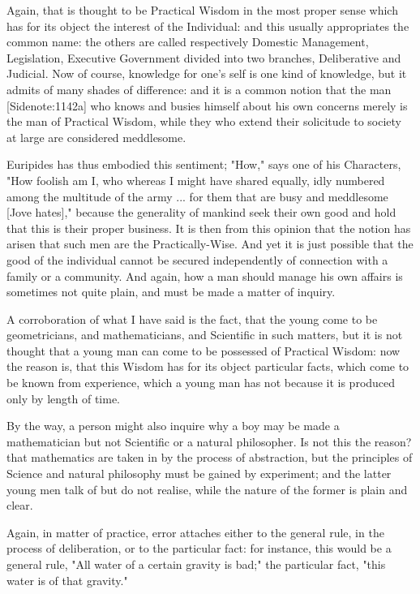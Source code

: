 Again, that is thought to be Practical Wisdom in the most proper sense
which has for its object the interest of the Individual: and this
usually appropriates the common name: the others are called respectively
Domestic Management, Legislation, Executive Government divided into two
branches, Deliberative and Judicial. Now of course, knowledge for
one's self is one kind of knowledge, but it admits of many shades of
difference: and it is a common notion that the man [Sidenote:1142a] who
knows and busies himself about his own concerns merely is the man of
Practical Wisdom, while they who extend their solicitude to society at
large are considered meddlesome.

Euripides has thus embodied this sentiment; "How," says one of his
Characters, "How foolish am I, who whereas I might have shared equally,
idly numbered among the multitude of the army ... for them that are busy
and meddlesome [Jove hates]," because the generality of mankind seek
their own good and hold that this is their proper business. It is then
from this opinion that the notion has arisen that such men are the
Practically-Wise. And yet it is just possible that the good of the
individual cannot be secured independently of connection with a family
or a community. And again, how a man should manage his own affairs is
sometimes not quite plain, and must be made a matter of inquiry.

A corroboration of what I have said is the fact, that the young come to
be geometricians, and mathematicians, and Scientific in such matters,
but it is not thought that a young man can come to be possessed of
Practical Wisdom: now the reason is, that this Wisdom has for its object
particular facts, which come to be known from experience, which a young
man has not because it is produced only by length of time.

By the way, a person might also inquire why a boy may be made a
mathematician but not Scientific or a natural philosopher. Is not this
the reason? that mathematics are taken in by the process of abstraction,
but the principles of Science and natural philosophy must be gained by
experiment; and the latter young men talk of but do not realise, while
the nature of the former is plain and clear.

Again, in matter of practice, error attaches either to the general rule,
in the process of deliberation, or to the particular fact: for instance,
this would be a general rule, "All water of a certain gravity is bad;"
the particular fact, "this water is of that gravity."

